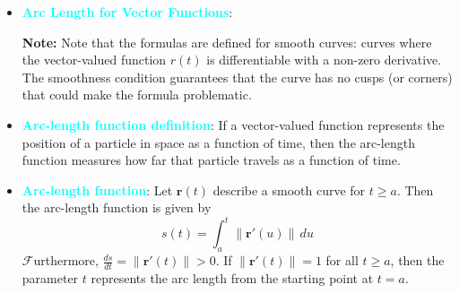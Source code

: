\documentclass{report}
\begin{document}
\begin{itemize}
            \pagebreak 
        \item \textbf{\textcolor{cyan}{Arc Length for Vector Functions}}:
            \bigbreak \noindent 
            \textbf{Note:} Note that the formulas are defined for smooth curves: curves where the vector-valued function $r(t)$ is differentiable with a non-zero derivative. The smoothness condition guarantees that the curve has no cusps (or corners) that could make the formula problematic.
        \item \textbf{\textcolor{cyan}{Arc-length function definition}}: If a vector-valued function represents the position of a particle in space as a function of time, then the arc-length function measures how far that particle travels as a function of time.
        \item \textbf{\textcolor{cyan}{Arc-length function}}:
            Let $\mathbf{r}(t)$ describe a smooth curve for $t \geq a$. Then the arc-length function is given by
            \begin{equation}
                s(t) = \int_{a}^{t} \|\mathbf{r}'(u)\| \, du
            \end{equation}
            $\mathscr{F}$urthermore, $\frac{ds}{dt} = \|\mathbf{r}'(t)\| > 0$. If $\|\mathbf{r}'(t)\| = 1$ for all $t \geq a$, then the parameter $t$ represents the arc length from the starting point at $t = a$.

\end{itemize}
\end{document}
